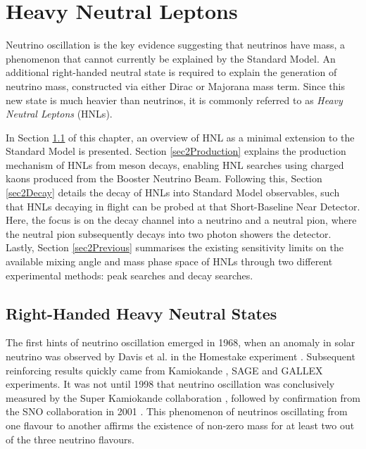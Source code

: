 
\chapter{Heavy Neutral Leptons}

\ifpdf
    \graphicspath{{Chapter2/Figs/Raster/}{Chapter2/Figs/PDF/}{Chapter2/Figs/}}
\else
    \graphicspath{{Chapter2/Figs/Vector/}{Chapter2/Figs/}}
\fi


Neutrino oscillation is the key evidence suggesting that neutrinos have mass, a phenomenon that cannot currently be explained by the Standard Model.
An additional right-handed neutral state is required to explain the generation of neutrino mass, constructed via either Dirac or Majorana mass term.
Since this new state is much heavier than neutrinos, it is commonly referred to as \textit{Heavy Neutral Leptons} (HNLs).

In Section \ref{sec2Overview} of this chapter, an overview of HNL as a minimal extension to the Standard Model is presented.
Section \ref{sec2Production} explains the production mechanism of HNLs from meson decays, enabling HNL searches using charged kaons produced from the Booster Neutrino Beam.
Following this, Section \ref{sec2Decay} details the decay of HNLs into Standard Model observables, such that HNLs decaying in flight can be probed at that Short-Baseline Near Detector. 
Here, the focus is on the decay channel into a neutrino and a neutral pion, where the neutral pion subsequently decays into two photon showers the detector.
Lastly, Section \ref{sec2Previous} summarises the existing sensitivity limits on the available mixing angle and mass phase space of HNLs through two different experimental methods: peak searches and decay searches.

\newpage
\section{Right-Handed Heavy Neutral States}
\label{sec2Overview}
The first hints of neutrino oscillation emerged in 1968, when an anomaly in solar neutrino was observed by Davis et al. in the Homestake experiment \cite{Homestake}.
Subsequent reinforcing results quickly came from Kamiokande \cite{Kamiokande}, SAGE \cite{SAGE} and GALLEX \cite{GALLEX} experiments.
It was not until 1998 that neutrino oscillation was conclusively measured by the Super Kamiokande collaboration \cite{superK}, followed by confirmation from the SNO collaboration in 2001 \cite{SNO}. 
This phenomenon of neutrinos oscillating from one flavour to another affirms the existence of non-zero mass for at least two out of the three neutrino flavours.

